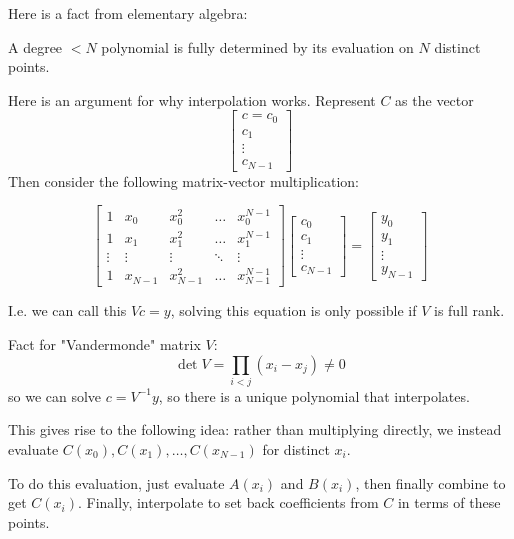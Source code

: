 Here is a fact from elementary algebra:
\begin{note} 
    A degree $< N$ polynomial is fully determined by its evaluation on $N$ distinct points.

    \begin{proof*}
    Here is an argument for why interpolation works. Represent $C$ as the vector
    \[ \begin{bmatrix} c = 
        c_0 \\ c_1 \\ \vdots \\ c_{N - 1}
    \end{bmatrix} \]
    Then consider the following matrix-vector multiplication:
    
    \[ \begin{bmatrix}
        1 & x_0 & x_0^2 & \dots & x_0^{N-1} \\
        1 & x_1 & x_1^2 & \dots & x_1^{N-1} \\
        \vdots & \vdots & \vdots & \ddots & \vdots \\
        1 & x_{N - 1} & x_{N-1}^2 & \dots & x_{N-1}^{N-1}
    \end{bmatrix} \begin{bmatrix}
        c_0 \\ c_1 \\ \vdots \\ c_{N - 1}
    \end{bmatrix} = \begin{bmatrix}
        y_0 \\ y_1 \\ \vdots \\ y_{N - 1}
    \end{bmatrix}
    \]

    I.e. we can call this $Vc = y$, solving this equation is only possible if
    $V$ is full rank.

    Fact for "Vandermonde" matrix $V$:
    \[ \det{V} = \prod_{i < j} (x_i - x_j) \neq 0 \]
    so we can solve $c = V^{-1} y$, so there is a unique polynomial that interpolates.
    \end{proof*}
\end{note}

This gives rise to the following idea: rather than multiplying directly,
we instead evaluate $C(x_0), C(x_1), \dots, C(x_{N - 1})$ for distinct $x_i$.

To do this evaluation, just evaluate $A(x_i)$ and $B(x_i)$, then finally combine to get
$C(x_i)$. Finally, interpolate to set back coefficients from $C$ in terms of these points.

